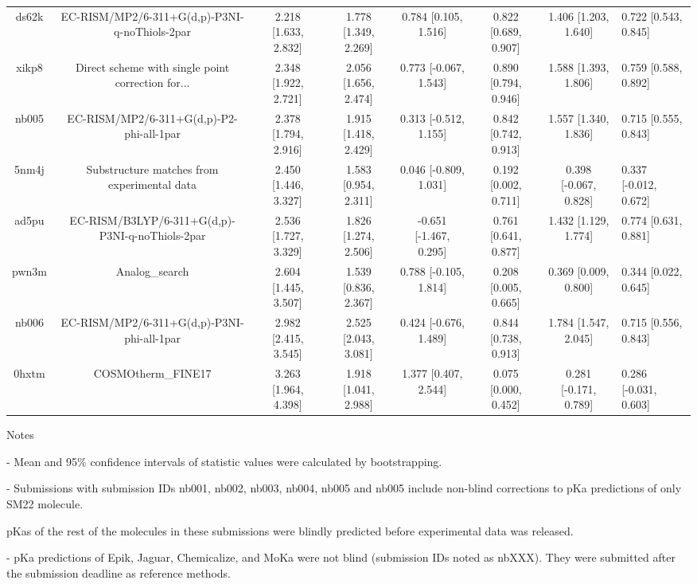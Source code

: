 \documentclass{article}
\begin{document}
\begin{center}
\begin{longtable}{|ccccccc|}
 ds62k &      EC-RISM/MP2/6-311+G(d,p)-P3NI-q-noThiols-2par &  2.218 [1.633, 2.832] &  1.778 [1.349, 2.269] &     0.784 [0.105, 1.516] &  0.822 [0.689, 0.907] &   1.406 [1.203, 1.640] &   0.722 [0.543, 0.845] \\
 xikp8 &  Direct scheme with single point correction for... &  2.348 [1.922, 2.721] &  2.056 [1.656, 2.474] &    0.773 [-0.067, 1.543] &  0.890 [0.794, 0.946] &   1.588 [1.393, 1.806] &   0.759 [0.588, 0.892] \\
 nb005 &           EC-RISM/MP2/6-311+G(d,p)-P2-phi-all-1par &  2.378 [1.794, 2.916] &  1.915 [1.418, 2.429] &    0.313 [-0.512, 1.155] &  0.842 [0.742, 0.913] &   1.557 [1.340, 1.836] &   0.715 [0.555, 0.843] \\
 5nm4j &        Substructure matches from experimental data &  2.450 [1.446, 3.327] &  1.583 [0.954, 2.311] &    0.046 [-0.809, 1.031] &  0.192 [0.002, 0.711] &  0.398 [-0.067, 0.828] &  0.337 [-0.012, 0.672] \\
 ad5pu &    EC-RISM/B3LYP/6-311+G(d,p)-P3NI-q-noThiols-2par &  2.536 [1.727, 3.329] &  1.826 [1.274, 2.506] &   -0.651 [-1.467, 0.295] &  0.761 [0.641, 0.877] &   1.432 [1.129, 1.774] &   0.774 [0.631, 0.881] \\
 pwn3m &                                     Analog\_search &  2.604 [1.445, 3.507] &  1.539 [0.836, 2.367] &    0.788 [-0.105, 1.814] &  0.208 [0.005, 0.665] &   0.369 [0.009, 0.800] &   0.344 [0.022, 0.645] \\
 nb006 &         EC-RISM/MP2/6-311+G(d,p)-P3NI-phi-all-1par &  2.982 [2.415, 3.545] &  2.525 [2.043, 3.081] &    0.424 [-0.676, 1.489] &  0.844 [0.738, 0.913] &   1.784 [1.547, 2.045] &   0.715 [0.556, 0.843] \\
 0hxtm &                                 COSMOtherm\_FINE17 &  3.263 [1.964, 4.398] &  1.918 [1.041, 2.988] &     1.377 [0.407, 2.544] &  0.075 [0.000, 0.452] &  0.281 [-0.171, 0.789] &  0.286 [-0.031, 0.603] \\
\end{longtable}
\end{center}

Notes

- Mean and 95\% confidence intervals of statistic values were calculated by bootstrapping.

- Submissions with submission IDs nb001, nb002, nb003, nb004, nb005 and nb005 include non-blind corrections to pKa predictions of only SM22 molecule.

pKas of the rest of the molecules in these submissions were blindly predicted before experimental data was released.

- pKa predictions of Epik, Jaguar, Chemicalize, and MoKa were not blind (submission IDs noted as nbXXX). They were submitted after the submission deadline as reference methods.
\end{document}
